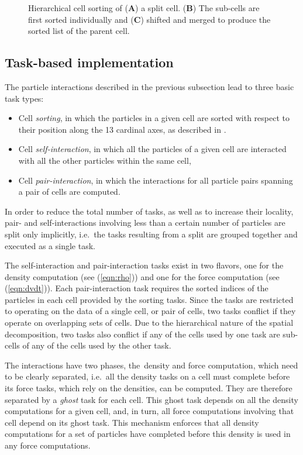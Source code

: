\documentclass[final]{siamltex}
\newcommand{\eqn}[1]
    {(\ref{eqn:#1})}
\newcommand{\bsf}[1]
    {\textbf{\textsf{#1}}}
\begin{document}
\begin{figure}
    \centerline{}
    
    \caption{Hierarchical cell sorting of ({\bsf A}) a split cell.
        ({\bsf B}) The sub-cells are first sorted individually and
        ({\bsf C}) shifted and merged to produce the sorted list
        of the parent cell.
        }
    \label{fig:HierarchySorting}
\end{figure}


\subsection{Task-based implementation}

The particle interactions described in the previous subsection
lead to three basic task types:
%
\begin{itemize}
    \item Cell {\em sorting}, in which the particles in a given
        cell are sorted with respect to their position along the
        13 cardinal axes, as described in \cite{ref:Gonnet2013}.
    \item Cell {\em self-interaction}, in which all the particles
        of a given cell are interacted with all the other particles
        within the same cell,
    \item Cell {\em pair-interaction}, in which the interactions for
        all particle pairs spanning a pair of cells are computed. 
\end{itemize}
%
In order to reduce the total number of tasks,
as well as to increase their locality, pair- and self-interactions involving
less than a certain number
of particles are split only implicitly, i.e.~the tasks resulting
from a split are grouped together and executed as a single
task.

The self-interaction and pair-interaction tasks exist in
two flavors, one for the density computation (see \eqn{rho})
and one for the force computation (see \eqn{dvdt}).
Each pair-interaction task requires the sorted indices of
the particles in each cell provided by the sorting tasks.
Since the tasks are restricted to operating on the data of a
single cell, or pair of cells, two tasks conflict if they
operate on overlapping sets of cells.
Due to the hierarchical nature of the spatial decomposition,
two tasks also conflict if any of the cells used by one task
are sub-cells of any of the cells used by the other task.

The interactions have two phases, the~density and force
computation, which need to be clearly separated, i.e.~all the density
tasks on a cell must complete before its force tasks, which
rely on the densities, can be computed.
They are therefore separated by a {\em ghost}
task for each cell.
This ghost task depends on all the density computations
for a given cell, and, in turn, all force computations involving
that cell depend on its ghost task.
This mechanism enforces that all density computations
for a set of particles have completed before this
density is used in any force computations.
\end{document}
